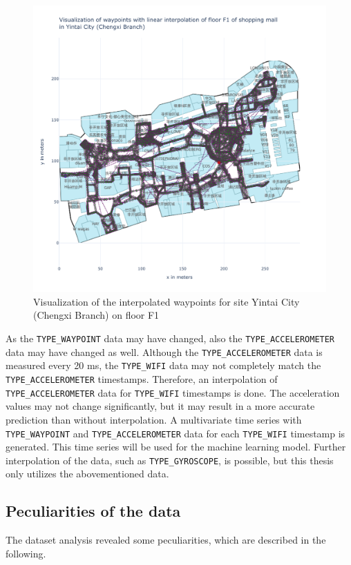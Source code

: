 \begin{figure}[h!]
    \centering
    \includegraphics[scale=0.6]{images/whole_floor_visualization_interpolated.pdf}
    \caption{Visualization of the interpolated waypoints for site Yintai City (Chengxi Branch) on floor F1}
    \label{fig:vis-interpolated}
\end{figure}

As the \texttt{TYPE\_WAYPOINT} data may have changed, also the \texttt{TYPE\_ACCELEROMETER} data may have changed as well.
Although the \texttt{TYPE\_ACCELEROMETER} data is measured every 20 ms, the \texttt{TYPE\_WIFI} data may not completely match the \texttt{TYPE\_ACCELEROMETER} timestamps.
Therefore, an interpolation of \texttt{TYPE\_ACCELEROMETER} data for \texttt{TYPE\_WIFI} timestamps is done.
The acceleration values may not change significantly, but it may result in a more accurate prediction than without interpolation.
A multivariate time series with \texttt{TYPE\_WAYPOINT} and \texttt{TYPE\_ACCELEROMETER} data for each \texttt{TYPE\_WIFI} timestamp is generated.
This time series will be used for the machine learning model.
Further interpolation of the data, such as \texttt{TYPE\_GYROSCOPE}, is possible, but this thesis only utilizes the abovementioned data.


\subsection{Peculiarities of the data}\label{sec:special-cases}
The dataset analysis revealed some peculiarities, which are described in the following.


